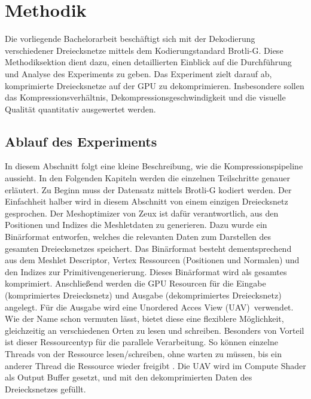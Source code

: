 \section{Methodik}
\label{sec:methodik}

Die vorliegende Bachelorarbeit beschäftigt sich mit der Dekodierung verschiedener Dreiecksnetze mittels dem Kodierungstandard Brotli-G.
Diese Methodiksektion dient dazu, einen detaillierten Einblick auf die Durchführung und Analyse des Experiments zu geben.
Das Experiment zielt darauf ab, komprimierte Dreiecksnetze auf der GPU zu dekomprimieren.
Insbesondere sollen das Kompressionsverhältnis, Dekompressionsgeschwindigkeit und die visuelle Qualität quantitativ ausgewertet werden.

\subsection{Ablauf des Experiments}
\label{subsec:ablauf}
In diesem Abschnitt folgt eine kleine Beschreibung, wie die Kompressionspipeline aussieht.
In den Folgenden Kapiteln werden die einzelnen Teilschritte genauer erläutert. \newline
Zu Beginn muss der Datensatz mittels Brotli-G kodiert werden.
Der Einfachheit halber wird in diesem Abschnitt von einem einzigen Dreiecksnetz gesprochen.
Der Meshoptimizer von Zeux \cite{Zeux} ist dafür verantwortlich, aus den Positionen und Indizes die Meshletdaten zu generieren.
Dazu wurde ein Binärformat entworfen, welches die relevanten Daten zum Darstellen des gesamten Dreiecksnetzes speichert.
Das Binärformat besteht dementsprechend aus dem Meshlet Descriptor, Vertex Ressourcen (Positionen und Normalen) und den Indizes zur Primitivengenerierung. \newline
Dieses Binärformat wird als gesamtes komprimiert.
Anschließend werden die GPU Resourcen für die Eingabe (komprimiertes Dreiecksnetz) und Ausgabe (dekomprimiertes Dreiecksnetz) angelegt. \newline
Für die Ausgabe wird eine \glqq Unordered Acces View (UAV)\grqq\ verwendet.
Wie der Name schon vermuten lässt, bietet diese eine flexiblere Möglichkeit, gleichzeitig an verschiedenen Orten zu lesen und schreiben.
Besonders von Vorteil ist dieser Ressourcentyp für die parallele Verarbeitung.
So können einzelne Threads von der Ressource lesen/schreiben, ohne warten zu müssen, bis ein anderer Thread die Ressource wieder freigibt \cite{Microsoft2021}. \newline
Die UAV wird im Compute Shader als Output Buffer gesetzt, und mit den dekomprimierten Daten des Dreiecksnetzes gefüllt.

